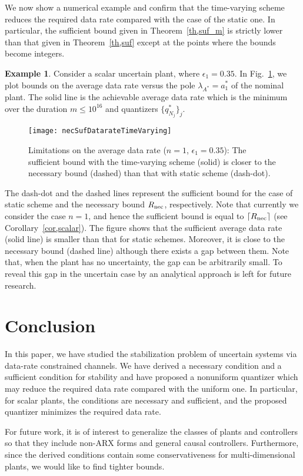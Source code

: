 \documentclass[a4paper, 11pt]{article}
\newcommand{\lambdaAS}{\lambda_{A^*}\!}
\newcommand{\Rnec}{R_{\textnormal{nec}}}
\theoremstyle{definition}
\newtheorem{exmp}{Example}
\newcommand{\fref}[1]{Fig.~\ref{#1}}
\begin{document}
We now show a numerical example and confirm that the time-varying scheme
reduces the required data rate compared with the case of the static one.
In particular, the sufficient bound given in Theorem~\ref{th,suf_m} is
strictly lower than that given in Theorem~\ref{th,suf} except at the points
where the bounds become integers.
\begin{exmp}
Consider a scalar uncertain plant, where $\epsilon_1=0.35$.
In \fref{fig,mstep}, we plot bounds on the average data rate
versus the pole $\lambdaAS=a^*_1$ of the nominal plant.
The solid line is the achievable average data rate which is the minimum over
the duration $m\leq 10^{16}$ and quantizers $\{q_{N_j}^*\}_j$.
\begin{figure}[t]
 \centering
 \texttt{[image: necSufDatarateTimeVarying]}
 \caption{Limitations on the average data rate ($n=1$, $\epsilon_1=0.35$):
 The sufficient bound with the time-varying scheme (solid) is closer
 to the necessary bound (dashed) than that with static scheme (dash-dot).}
 \label{fig,mstep}
\end{figure}
The dash-dot and the dashed lines represent the sufficient bound for
the case of static scheme and the necessary bound $\Rnec$, respectively.
Note that currently we consider the case $n=1$, and hence the sufficient
bound is equal to $\lceil \Rnec\rceil$ (see Corollary~\ref{cor,scalar}).
The figure shows that the sufficient average data rate (solid line) is
smaller than that for static schemes.
Moreover, it is close to the necessary bound (dashed line) although there
exists a gap between them.
Note that, when the plant has no uncertainty, the gap can be arbitrarily small.
To reveal this gap in the uncertain case by an analytical approach is left
for future research.
\end{exmp}


\section{Conclusion}\label{sec,conclusion}
In this paper, we have studied the stabilization problem of uncertain systems
via data-rate constrained channels.
We have derived a necessary condition and a sufficient condition for stability
and have proposed a nonuniform quantizer which may reduce the required
data rate compared with the uniform one.
In particular, for scalar plants, the conditions are necessary
and sufficient, and the proposed quantizer minimizes the required data rate.

For future work, it is of interest to generalize the classes of plants and
controllers so that they include non-ARX forms and general causal controllers.
Furthermore, since the derived conditions contain some conservativeness for
multi-dimensional plants, we would like to find tighter bounds.
\end{document}
